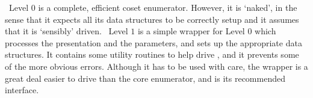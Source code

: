


\ace\ Level $0$ is a complete, efficient coset enumerator.
However, it is `naked'\kern-1.5pt, in the sense that it expects all its 
  data structures to be correctly setup and it assumes that it is
  `sensibly' driven.
\ace\ Level $1$ is a simple wrapper for Level $0$ which processes the 
  presentation and the parameters, and sets up the appropriate data
  structures.
It contains some utility routines to help drive \ace, and it prevents some
  of the more obvious errors.
Although it has to be used with care, the wrapper is a great deal easier to
  drive than the core enumerator, and is its recommended interface.

